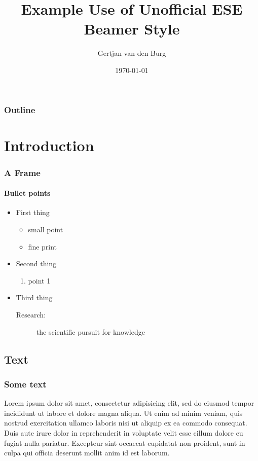 \documentclass[]{beamer}
\title{Example Use of Unofficial ESE Beamer Style}
\author{Gertjan van den Burg}
\date{\today}
\institute{Econometric Institute}
\begin{document}
\begin{frame}[plain]
	\titlepage
\end{frame}

\begin{frame}[t]
	\frametitle{Outline}
	\tableofcontents
\end{frame}


\section{Introduction}
\begin{frame}
	\frametitle{A Frame}
	\framesubtitle{Bullet points}
	\begin{itemize}
		\item First thing
		\begin{itemize}
			\item small point
			\item fine print
		\end{itemize}
		\item Second thing
		\begin{enumerate}
			\item point 1
		\end{enumerate}
		\item Third thing
		\begin{description}
			\item[Research:] the scientific pursuit for knowledge
		\end{description}
	\end{itemize}
\end{frame}

\subsection{Text}
\begin{frame}
	\frametitle{Some text}
	Lorem ipsum dolor sit amet, consectetur adipisicing elit, sed do 
	eiusmod tempor incididunt ut labore et dolore magna aliqua. Ut enim ad 
	minim veniam, quis nostrud exercitation ullamco laboris nisi ut aliquip 
	ex ea commodo consequat. Duis aute irure dolor in reprehenderit in 
	voluptate velit esse cillum dolore eu fugiat nulla pariatur. Excepteur 
	sint occaecat cupidatat non proident, sunt in culpa qui officia 
	deserunt mollit anim id est laborum.
\end{frame}
\end{document}
